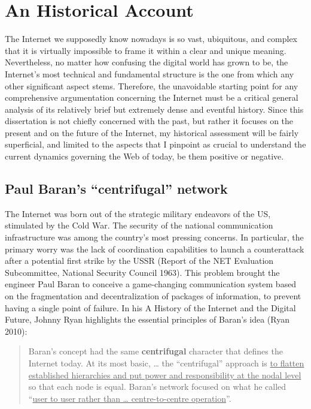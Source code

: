 \documentclass[
  a4paper,
]{book}
\begin{document}
\hypertarget{an-historical-account}{%
\chapter{An Historical Account}\label{an-historical-account}}

The Internet we supposedly know nowadays is so vast, ubiquitous, and complex that it is virtually impossible to frame it within a clear and unique meaning. Nevertheless, no matter how confusing the digital world has grown to be, the Internet's most technical and fundamental structure is the one from which any other significant aspect stems. Therefore, the unavoidable starting point for any comprehensive argumentation concerning the Internet must be a critical general analysis of its relatively brief but extremely dense and eventful history. Since this dissertation is not chiefly concerned with the past, but rather it focuses on the present and on the future of the Internet, my historical assessment will be fairly superficial, and limited to the aspects that I pinpoint as crucial to understand the current dynamics governing the Web of today, be them positive or negative.

\hypertarget{paul-barans-centrifugal-network}{%
\section{Paul Baran's ``centrifugal'' network}\label{paul-barans-centrifugal-network}}

The Internet was born out of the strategic military endeavors of the US, stimulated by the Cold War. The security of the national communication infrastructure was among the country's most pressing concerns. In particular, the primary worry was the lack of coordination capabilities to launch a counterattack after a potential first strike by the USSR {(Report of the {NET Evaluation Subcommittee}, {National Security Council} 1963)}. This problem brought the engineer Paul Baran to conceive a game-changing communication system based on the fragmentation and decentralization of packages of information, to prevent having a single point of failure. In his A History of the Internet and the Digital Future, Johnny Ryan highlights the essential principles of Baran's idea {(Ryan 2010)}:

\begin{quote}
Baran's concept had the same \textbf{centrifugal} character that defines the Internet today. At its most basic, \ldots{} the ``centrifugal'' approach is \uline{to flatten established hierarchies and put power and responsibility at the nodal level} so that each node is equal. Baran's network focused on what he called ``\uline{user to user rather than \ldots{} centre-to-centre operation}''.
\end{quote}
\end{document}
